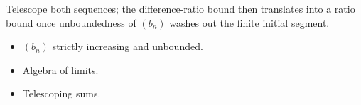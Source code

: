 \begin{remark*}
Telescope both sequences; the difference-ratio bound then translates into a ratio bound once unboundedness of $(b_n)$ washes out the finite initial segment.
\end{remark*}

\begin{remark*}[Dependencies]
\begin{itemize}
  \item $(b_n)$ strictly increasing and unbounded.
  \item Algebra of limits.
  \item Telescoping sums.
\end{itemize}
\end{remark*}
